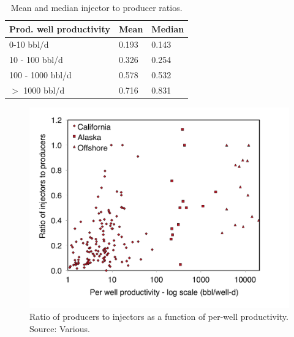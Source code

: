 \documentclass[11pt]{report}
\begin{document}
\begin{table}
\begin{scriptsize}
\caption{Mean and median injector to producer ratios.}
\label{tab:inj_prod_ratios}
\begin{tabular*}{0.75\columnwidth}{p{}p{}p{}}
\toprule
Prod. well productivity & Mean & Median \\
\midrule
0-10 bbl/d & 0.193 & 0.143 \\
10 - 100 bbl/d & 0.326 & 0.254 \\
100 - 1000 bbl/d & 0.578 & 0.532 \\
$>$ 1000 bbl/d & 0.716 & 0.831 \\
\bottomrule
\end{tabular*}
\end{scriptsize}
\end{table}


\begin{figure}[t]
\includegraphics[width=0.8\columnwidth]{images/inj_prod.pdf}
\caption{Ratio of producers to injectors as a function of per-well productivity. Source: Various.}
\label{fig:inj_prod}
\end{figure}
\end{document}
